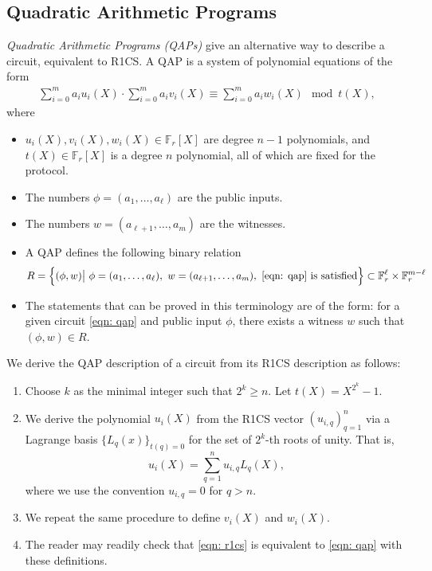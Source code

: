 \subsection{Quadratic Arithmetic Programs}
\emph{Quadratic Arithmetic Programs (QAPs)} give an alternative way to describe a circuit, equivalent to R1CS. A QAP is a system of polynomial equations of the form
\begin{align}
\sum_{i=0}^m a_i u_i(X) \cdot \sum_{i=0}^m a_i v_i(X) \equiv \sum_{i=0}^m a_i w_i(X) \mod t(X), \label{eqn: qap}
\end{align}
where 
\begin{itemize}
\item $u_i(X), v_i(X), w_i(X) \in \mathbb{F}_r[X]$ are degree $n-1$ polynomials, and $t(X) \in \mathbb{F}_r[X]$ is a degree $n$ polynomial, all of which are fixed for the protocol.
\item The numbers $\phi = (a_1, \dots, a_\ell)$ are the public inputs.
\item The numbers $w = (a_{\ell + 1}, \dots, a_m)$ are the witnesses.
\item A QAP defines the following binary relation
\begin{align}
R = \left\{ (\phi, w) \big| \ \phi = (a_1, \dots, a_\ell), \ w = (a_{\ell + 1}, \dots, a_m), \ \eqref{eqn: qap} \textrm{ is satisfied} \right\} \subset \mathbb{F}_r^\ell \times \mathbb{F}_r^{m-\ell}
\end{align}
\item The statements that can be proved in this terminology are of the form: for a given circuit \eqref{eqn: qap} and public input $\phi$, there exists a witness $w$ such that $(\phi, w) \in R$.
\end{itemize}

We derive the QAP description of a circuit from its R1CS description as follows:
\begin{enumerate}
    \item Choose $k$ as the minimal integer such that $2^k \geq n$. Let $t(X) = X^{2^k} - 1$.
    \item We derive the polynomial $u_i(X)$ from the R1CS vector $(u_{i,q})_{q=1}^n$ via a Lagrange basis $\{ L_q(x) \}_{t(q) = 0}$ for the set of $2^k$-th roots of unity.  That is,
    \begin{equation}
        u_i(X) = \sum_{q=1}^n u_{i,q} L_q(X),
    \end{equation}
    where we use the convention $u_{i,q} = 0$ for $q > n$.
    \item We repeat the same procedure to define $v_i(X)$ and $w_i(X)$.
    \item The reader may readily check that \eqref{eqn: r1cs} is equivalent to \eqref{eqn: qap} with these definitions.
\end{enumerate}

